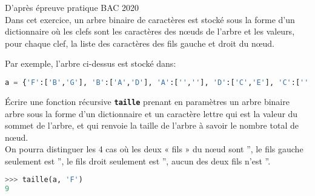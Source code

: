 \documentclass[a4paper,11pt]{article}
\begin{document}
\begin{exo}
D'après épreuve pratique BAC 2020\\
Dans cet exercice, un arbre binaire de caractères est stocké sous la forme d’un dictionnaire où les clefs sont les caractères des nœuds de l’arbre et les valeurs, pour
chaque clef, la liste des caractères des fils gauche et droit du nœud.
\begin{center}
\end{center}
Par exemple, l'arbre ci-dessus est stocké dans:
\begin{center}
\begin{lstlisting}[language=Python  , xleftmargin=2em, xrightmargin=2em]
a = {'F':['B','G'], 'B':['A','D'], 'A':['',''], 'D':['C','E'], 'C':['',''], 'E':['',''], 'G':['','I'], 'I':['','H'], 'H':['','']}
\end{lstlisting}
\end{center}
Écrire une fonction récursive \texttt{\textbf{taille}} prenant en paramètres un arbre binaire arbre
sous la forme d’un dictionnaire et un caractère lettre qui est la valeur du sommet de l’arbre, et qui renvoie la taille de l’arbre à savoir le nombre total de nœud.\\
On pourra distinguer les 4 cas où les deux « fils » du nœud sont '', le fils gauche seulement est '', le fils droit seulement est '', aucun des deux fils n’est ''.
\begin{center}
\begin{lstlisting}[language=Python  , xleftmargin=2em, xrightmargin=2em]
>>> taille(a, 'F')
9
\end{lstlisting}
\label{CODE}
\end{center}
\end{exo}
\end{document}
